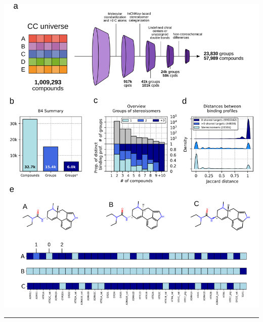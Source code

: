 \begin{Figure_modified}
  \centering
  \includegraphics[width=1\linewidth]{figures/Stereoisomers/Main/Fig1_v2.png}
  \caption*{
    \textbf{Stereoisomerism and bioactivity.}
    \textbf{a)} Computational pipeline to identify groups of stereoisomers in the CC universe.
    \textbf{b)} Number of unique stereoisomeric compounds with experimentally identified protein targets in the CC B4 space, number of stereoisomer groups, and number of groups with at least 2 compounds with non-identical binding profiles.
    \textbf{c)} Number of groups (y-axis, top) having the specified number of stereoisomers (x-axis). Proportion of these groups (y-axis, bottom) having the specified number of distinct binding profiles (i.e. \textasciitilde60\% of the groups of 2 isomers have a unique binding profile).
    \textbf{d)} Distributions of Jaccard distances (binding profiles) between pairs of compounds sharing 0, ≥1 targets and stereoisomer pairs. All distributions are significantly different from each other (Mann-Whitney p-value\textasciitilde0).
    \textbf{e)} Illustrative example of a stereoisomer group including 3 small molecules with their corresponding target binding profiles, using the annotation of type 0 signatures (i.e. 0: no binding; 1: weak binding and 2: strong binding).
  }
  \vspace{-5mm}
  \rule[0ex]{\textwidth}{0.5pt}
  \vspace{-9mm}
  \label{Stereoisomers_Fig1}
\end{Figure_modified}


